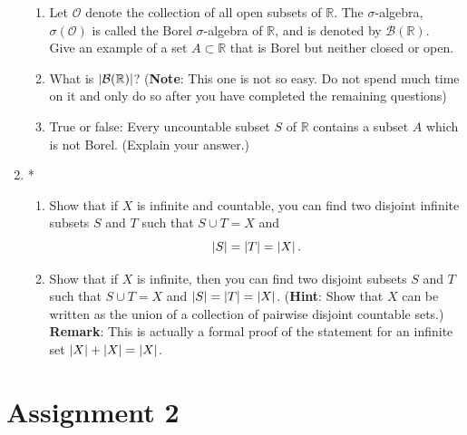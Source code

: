 \documentclass[notoc,notitlepage]{tufte-book}
\begin{document}
\begin{enumerate}
\begin{enumerate}
      \item Let $\mathcal{O}$ denote the collection of all open subsets of $\mathbb{R}$. The $\sigma$-algebra, $\sigma(\mathcal{O})$ is called the Borel $\sigma$-algebra of $\mathbb{R}$, and is denoted by $\mathcal{B}(\mathbb{R})$. \\
        Give an example of a set $A \subset \mathbb{R}$ that is Borel but neither closed or open.

      \item What is $\left| \mathcal{B}(\mathbb{R}) \right|$? (\textbf{Note}: This one is not so easy. Do not spend much time on it and only do so after you have completed the remaining questions)
      \item True or false: Every uncountable subset $S$ of $\mathbb{R}$ contains a subset $A$ which is not Borel. (Explain your answer.)
    \end{enumerate}

  \item *\begin{enumerate}
    \item Show that if $X$ is infinite and countable, you can find two disjoint infinite subsets $S$ and $T$ such that $S \cup T = X$ and\label{item:7_a}
      \begin{equation*}
        \left|S\right| = \left|T\right| = \left|X\right|.
      \end{equation*}

    \item Show that if $X$ is infinite, then you can find two disjoint subsets $S$ and $T$ such that $S \cup T = X$ and $\left|S\right| = \left|T\right| = \left|X\right|$. (\textbf{Hint}: Show that $X$ can be written as the union of a collection of pairwise disjoint countable sets.) \\
      \textbf{Remark}: This is actually a formal proof of the statement for an infinite set $\left|X\right| + \left|X\right| = \left|X\right|$. 
  \end{enumerate}
\end{enumerate}


\chapter{Assignment 2}%
\label{chp:assignment_2}
\end{document}
